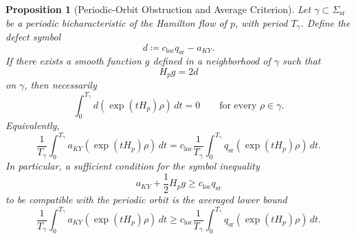\documentclass[12pt,a4paper]{article}
\newtheorem{proposition}[theorem]{Proposition}
\begin{document}
\begin{proposition}[Periodic-Orbit Obstruction and Average Criterion]\label{prop:periodic-orbit-criterion}
Let $\gamma \subset \Sigma_{\mathrm{sr}}$ be a periodic bicharacteristic of the Hamilton flow of $p$, with period $T_\gamma$. Define the defect symbol
\begin{equation}
d \coloneqq c_{\mathrm{loc}} q_{\mathrm{sr}} - a_{KY}.
\end{equation}
If there exists a smooth function $g$ defined in a neighborhood of $\gamma$ such that
\begin{equation}\label{eq:periodic-transport}
H_p g = 2d
\end{equation}
on $\gamma$, then necessarily
\begin{equation}\label{eq:periodic-average-zero}
\int_0^{T_\gamma} d(\exp(tH_p)\rho)\,dt = 0
\qquad \text{for every } \rho \in \gamma.
\end{equation}
Equivalently,
\begin{equation}\label{eq:periodic-average-criterion}
\frac{1}{T_\gamma}\int_0^{T_\gamma} a_{KY}(\exp(tH_p)\rho)\,dt
=
c_{\mathrm{loc}}\frac{1}{T_\gamma}\int_0^{T_\gamma} q_{\mathrm{sr}}(\exp(tH_p)\rho)\,dt.
\end{equation}
In particular, a sufficient condition for the symbol inequality
\begin{equation}
a_{KY} + \frac12 H_p g \ge c_{\mathrm{loc}} q_{\mathrm{sr}}
\end{equation}
to be compatible with the periodic orbit is the averaged lower bound
\begin{equation}\label{eq:periodic-average-positive}
\frac{1}{T_\gamma}\int_0^{T_\gamma} a_{KY}(\exp(tH_p)\rho)\,dt
\ge
c_{\mathrm{loc}}\frac{1}{T_\gamma}\int_0^{T_\gamma} q_{\mathrm{sr}}(\exp(tH_p)\rho)\,dt.
\end{equation}
\end{proposition}
\end{document}

